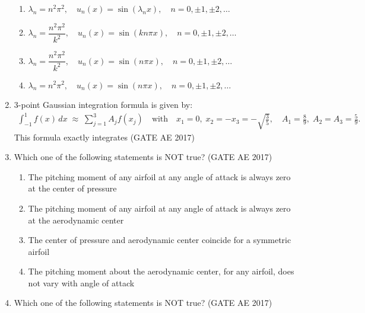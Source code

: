 \documentclass[journal,12pt,onecolumn]{IEEEtran}
\theoremstyle{remark}
\begin{document}
\begin{flushleft}
\begin{enumerate}
\begin{enumerate}
\item $\lambda_n=n^{2}\pi^{2},\quad u_n(x)=\sin(\lambda_n x),\quad n=0,\pm1,\pm2,\dots$
\item $\lambda_n=\dfrac{n^{2}\pi^{2}}{k^{2}},\quad u_n(x)=\sin(kn\pi x),\quad n=0,\pm1,\pm2,\dots$
\item $\lambda_n=\dfrac{n^{2}\pi^{2}}{k^{2}},\quad u_n(x)=\sin(n\pi x),\quad n=0,\pm1,\pm2,\dots$
\item $\lambda_n=n^{2}\pi^{2},\quad u_n(x)=\sin(n\pi x),\quad n=0,\pm1,\pm2,\dots$
\end{enumerate}

\item
3-point Gaussian integration formula is given by:
\begin{align*}
\int_{-1}^{1} f(x)\, dx \;\approx\; \sum_{j=1}^{3} A_j f(x_j) 
\quad \text{with} \quad 
x_1=0,\; x_2=-x_3=-\sqrt{\tfrac{3}{5}}, \quad 
A_1=\tfrac{8}{9},\; A_2=A_3=\tfrac{5}{9}.
\end{align*}
This formula exactly integrates \hfill (GATE AE 2017)

\begin{enumerate}
\end{enumerate}

\item
Which one of the following statements is NOT true?  
\hfill (GATE AE 2017)

\begin{enumerate}
\item The pitching moment of any airfoil at any angle of attack is always zero at the center of pressure
\item The pitching moment of any airfoil at any angle of attack is always zero at the aerodynamic center
\item The center of pressure and aerodynamic center coincide for a symmetric airfoil
\item The pitching moment about the aerodynamic center, for any airfoil, does not vary with angle of attack
\end{enumerate}

\item
Which one of the following statements is NOT true?  
\hfill (GATE AE 2017)


\end{enumerate}
\end{flushleft}
\end{document}
